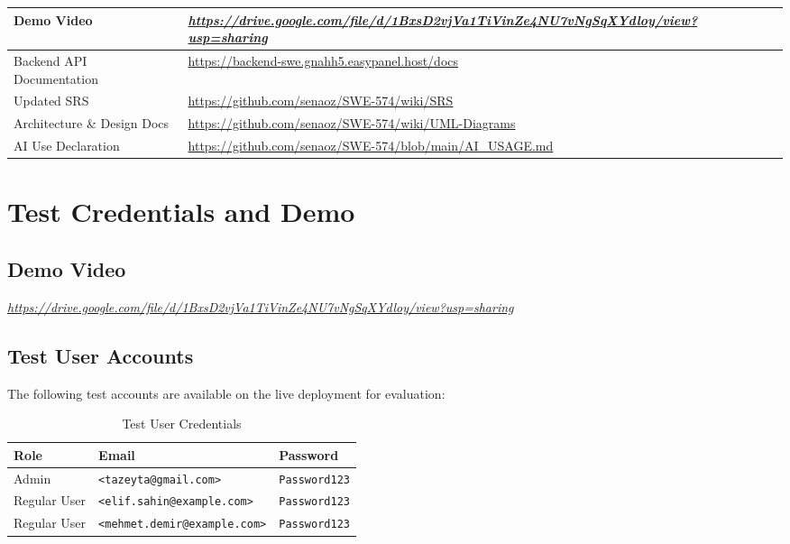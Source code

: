 \documentclass[11pt,a4paper]{report}
\begin{document}
\begin{table}[h]
\begin{tabularx}{\textwidth}{|l|X|}
        \hline
        Demo Video                           & \textit{\url{https://drive.google.com/file/d/1BxsD2vjVa1TiVinZe4NU7vNgSqXYdloy/view?usp=sharing}} \\
        \hline
        Backend API Documentation            & \url{https://backend-swe.gnahh5.easypanel.host/docs}                                        \\
        \hline
        Updated SRS                          & \url{https://github.com/senaoz/SWE-574/wiki/SRS}                                            \\
        \hline
        Architecture \& Design Docs          & \url{https://github.com/senaoz/SWE-574/wiki/UML-Diagrams}                                   \\
        \hline
        AI Use Declaration                   & \url{https://github.com/senaoz/SWE-574/blob/main/AI_USAGE.md}
        \\
        \hline
    \end{tabularx}
\end{table}

\chapter{Test Credentials and Demo}

\section{Demo Video}

\textit{\url{https://drive.google.com/file/d/1BxsD2vjVa1TiVinZe4NU7vNgSqXYdloy/view?usp=sharing}}

\section{Test User Accounts}

The following test accounts are available on the live deployment for evaluation:

\begin{table}[h]
    \centering
    \begin{tabularx}{\textwidth}{|l|l|X|}
        \hline
        \textbf{Role} & \textbf{Email}                      & \textbf{Password}    \\
        \hline
        Admin         & \texttt{<tazeyta@gmail.com>}        & \texttt{Password123} \\
        \hline
        Regular User  & \texttt{<elif.sahin@example.com>}   & \texttt{Password123} \\
        \hline
        Regular User  & \texttt{<mehmet.demir@example.com>} & \texttt{Password123} \\
        \hline
    \end{tabularx}
    \caption{Test User Credentials}
\end{table}
\end{document}
